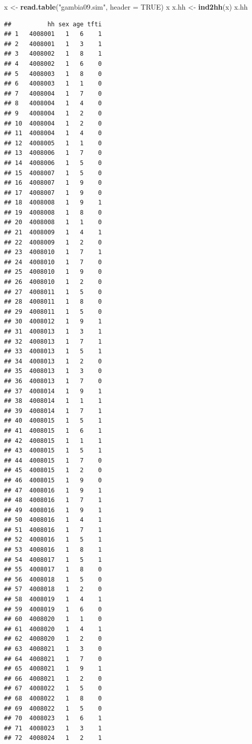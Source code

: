 \documentclass[12pt,a4paper]{book}
\newenvironment{Shaded}{\begin{snugshade}}{\end{snugshade}}
\newcommand{\DataTypeTok}[1]{\textcolor[rgb]{0.13,0.29,0.53}{#1}}
\newcommand{\KeywordTok}[1]{\textcolor[rgb]{0.13,0.29,0.53}{\textbf{#1}}}
\newcommand{\NormalTok}[1]{#1}
\newcommand{\OtherTok}[1]{\textcolor[rgb]{0.56,0.35,0.01}{#1}}
\newcommand{\StringTok}[1]{\textcolor[rgb]{0.31,0.60,0.02}{#1}}
\theoremstyle{definition}
\theoremstyle{definition}
\theoremstyle{definition}
\theoremstyle{remark}
\begin{document}
\begin{Shaded}
\begin{Highlighting}[]
\NormalTok{x <-}\StringTok{ }\KeywordTok{read.table}\NormalTok{(}\StringTok{"gambia09.sim"}\NormalTok{, }\DataTypeTok{header =} \OtherTok{TRUE}\NormalTok{)}
\NormalTok{x}
\NormalTok{x.hh <-}\StringTok{ }\KeywordTok{ind2hh}\NormalTok{(x)}
\NormalTok{x.hh}
\end{Highlighting}
\end{Shaded}

\begin{verbatim}
##          hh sex age tfti
## 1   4008001   1   6    1
## 2   4008001   1   3    1
## 3   4008002   1   8    1
## 4   4008002   1   6    0
## 5   4008003   1   8    0
## 6   4008003   1   1    0
## 7   4008004   1   7    0
## 8   4008004   1   4    0
## 9   4008004   1   2    0
## 10  4008004   1   2    0
## 11  4008004   1   4    0
## 12  4008005   1   1    0
## 13  4008006   1   7    0
## 14  4008006   1   5    0
## 15  4008007   1   5    0
## 16  4008007   1   9    0
## 17  4008007   1   9    0
## 18  4008008   1   9    1
## 19  4008008   1   8    0
## 20  4008008   1   1    0
## 21  4008009   1   4    1
## 22  4008009   1   2    0
## 23  4008010   1   7    1
## 24  4008010   1   7    0
## 25  4008010   1   9    0
## 26  4008010   1   2    0
## 27  4008011   1   5    0
## 28  4008011   1   8    0
## 29  4008011   1   5    0
## 30  4008012   1   9    1
## 31  4008013   1   3    1
## 32  4008013   1   7    1
## 33  4008013   1   5    1
## 34  4008013   1   2    0
## 35  4008013   1   3    0
## 36  4008013   1   7    0
## 37  4008014   1   9    1
## 38  4008014   1   1    1
## 39  4008014   1   7    1
## 40  4008015   1   5    1
## 41  4008015   1   6    1
## 42  4008015   1   1    1
## 43  4008015   1   5    1
## 44  4008015   1   7    0
## 45  4008015   1   2    0
## 46  4008015   1   9    0
## 47  4008016   1   9    1
## 48  4008016   1   7    1
## 49  4008016   1   9    1
## 50  4008016   1   4    1
## 51  4008016   1   7    1
## 52  4008016   1   5    1
## 53  4008016   1   8    1
## 54  4008017   1   5    1
## 55  4008017   1   8    0
## 56  4008018   1   5    0
## 57  4008018   1   2    0
## 58  4008019   1   4    1
## 59  4008019   1   6    0
## 60  4008020   1   1    0
## 61  4008020   1   4    1
## 62  4008020   1   2    0
## 63  4008021   1   3    0
## 64  4008021   1   7    0
## 65  4008021   1   9    1
## 66  4008021   1   2    0
## 67  4008022   1   5    0
## 68  4008022   1   8    0
## 69  4008022   1   5    0
## 70  4008023   1   6    1
## 71  4008023   1   3    1
## 72  4008024   1   2    1

\end{verbatim}
\end{document}
